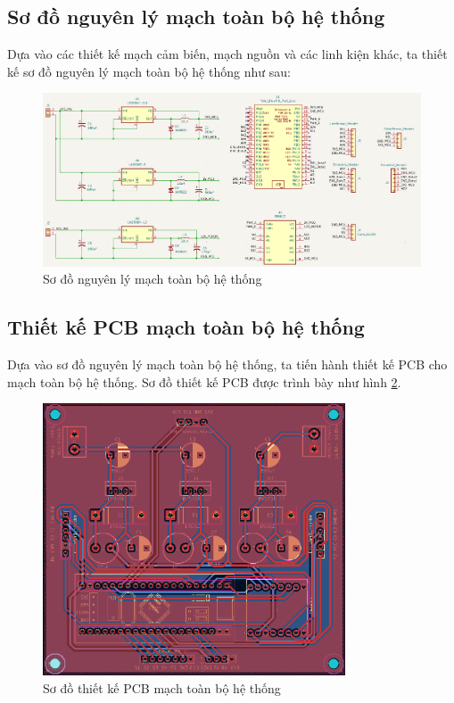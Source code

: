             \subsection{Sơ đồ nguyên lý mạch toàn bộ hệ thống}
                \hspace*{0.6cm}Dựa vào các thiết kế mạch cảm biến, mạch nguồn và các linh kiện khác, ta thiết kế sơ đồ nguyên lý mạch toàn bộ hệ thống như sau:
                \begin{figure}[H]
                    \centering
                    \includegraphics[width=1\textwidth]{pictures/chapter4/c4_p18_Schematic.png}
                    \caption{Sơ đồ nguyên lý mạch toàn bộ hệ thống}
                    \label{fig:4-17}
                \end{figure}
            \subsection{Thiết kế PCB mạch toàn bộ hệ thống}
                \hspace*{0.6cm}Dựa vào sơ đồ nguyên lý mạch toàn bộ hệ thống, ta tiến hành thiết kế PCB cho mạch toàn bộ hệ thống. Sơ đồ thiết kế PCB được trình bày như hình \ref{fig:4-18}.
                \begin{figure}[H]
                    \centering
                    \includegraphics[width=0.8\textwidth]{pictures/chapter4/c4_p19_PCB.png}
                    \caption{Sơ đồ thiết kế PCB mạch toàn bộ hệ thống}
                    \label{fig:4-18}
                \end{figure}
            
                